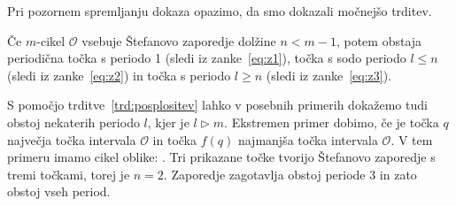 \documentclass[../TG_magistrsko_delo_sections.tex]{subfiles}
\begin{document}
Pri pozornem spremljanju dokaza opazimo, da smo dokazali močnejšo trditev.

\begin{trditev}\label{trd:posplositev}
Če $m$-cikel $\mathcal{O}$ vsebuje Štefanovo zaporedje dolžine $n<m-1$, potem obstaja periodična točka s periodo 1 (sledi iz zanke~\ref{eq:z1}), točka s sodo periodo $l \leq n$ (sledi iz zanke~\ref{eq:z2}) in točka s periodo $l \geq n$ (sledi iz zanke~\ref{eq:z3}).
\end{trditev}

S pomočjo trditve~\ref{trd:posplositev} lahko v posebnih primerih dokažemo tudi obstoj nekaterih periodo $l$, kjer je $l \triangleright m$. 
Ekstremen primer dobimo, če je točka $q$ največja točka intervala $\mathcal{O}$ in točka $f(q)$ najmanjša točka intervala $\mathcal{O}$.  V tem primeru imamo cikel oblike:
.
Tri prikazane točke tvorijo Štefanovo zaporedje s tremi točkami, torej je $n=2$. Zaporedje zagotavlja obstoj periode 3 in zato obstoj vseh period.
\end{document}
